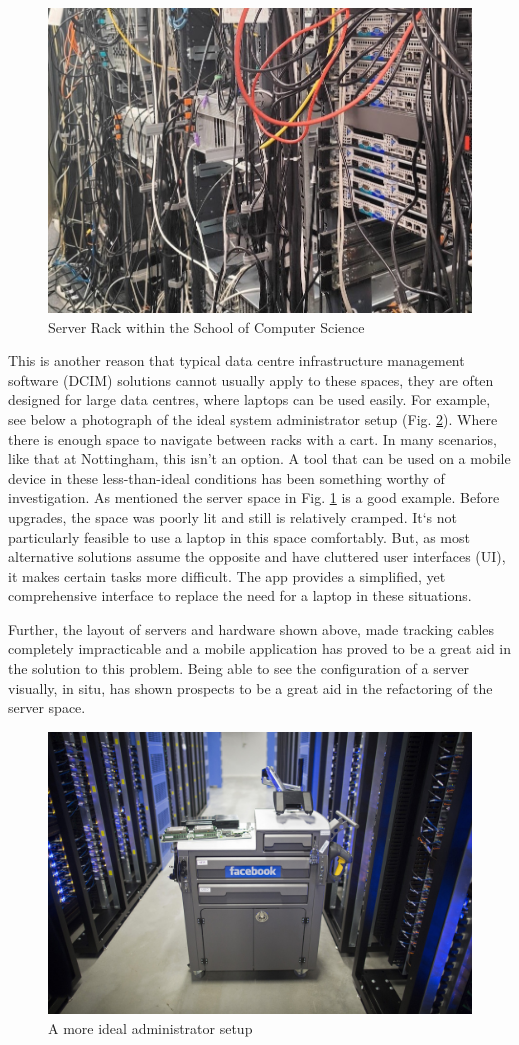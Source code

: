 \documentclass [11pt,a4paper]{article}
\begin{document}
\begin{figure}[H]
    \centering
    \includegraphics[width=0.40\linewidth]{images/server_racks.jpg}
    \caption{Server Rack within the School of Computer Science\cite{server_pic}}
    \label{fig:server_rack}
\end{figure}

This is another reason that typical data centre infrastructure management software (DCIM) solutions cannot usually apply to these spaces, they are often designed for large data centres, where laptops can be used easily. For example, see below a photograph of the ideal system administrator setup (Fig. \ref{fig:ideal_server_setup}). Where there is enough space to navigate between racks with a cart. In many scenarios, like that at Nottingham, this isn't an option. A tool that can be used on a mobile device in these less-than-ideal conditions has been something worthy of investigation. As mentioned the server space in Fig. \ref{fig:server_rack} is a good example. Before upgrades, the space was poorly lit and still is relatively cramped. It`s not particularly feasible to use a laptop in this space comfortably. But, as most alternative solutions assume the opposite and have cluttered user interfaces (UI), it makes certain tasks more difficult. The app provides a simplified, yet comprehensive interface to replace the need for a laptop in these situations.

Further, the layout of servers and hardware shown above, made tracking cables completely impracticable and a mobile application has proved to be a great aid in the solution to this problem. Being able to see the configuration of a server visually, in situ, has shown prospects to be a great aid in the refactoring of the server space.

\begin{figure}[H]
    \centering
    \includegraphics[width=0.40\linewidth]{images/facebook_cart.jpg}
    \caption{A more ideal administrator setup \cite{rosenblatt_2018}}
    \label{fig:ideal_server_setup}
\end{figure}
\end{document}
